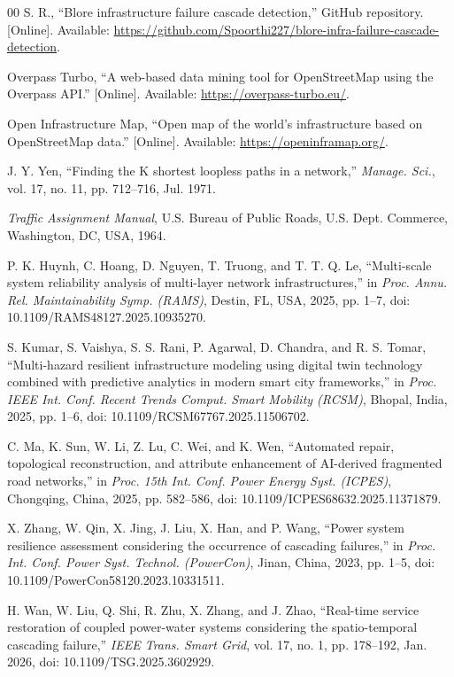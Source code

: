 \documentclass[oneside]{ieeeaccess}
\begin{document}
\begin{thebibliography}{00}
S. R., ``Blore infrastructure failure cascade detection,'' GitHub repository. [Online]. Available: \url{https://github.com/Spoorthi227/blore-infra-failure-cascade-detection}.

Overpass Turbo, ``A web-based data mining tool for OpenStreetMap using the Overpass API.'' [Online]. Available: \url{https://overpass-turbo.eu/}.

Open Infrastructure Map, ``Open map of the world's infrastructure based on OpenStreetMap data.'' [Online]. Available: \url{https://openinframap.org/}.

J. Y. Yen, ``Finding the K shortest loopless paths in a network,'' \emph{Manage. Sci.}, vol. 17, no. 11, pp. 712--716, Jul. 1971.

\emph{Traffic Assignment Manual}, U.S. Bureau of Public Roads, U.S. Dept. Commerce, Washington, DC, USA, 1964.

P. K. Huynh, C. Hoang, D. Nguyen, T. Truong, and T. T. Q. Le, ``Multi-scale system reliability analysis of multi-layer network infrastructures,'' in \emph{Proc. Annu. Rel. Maintainability Symp. (RAMS)}, Destin, FL, USA, 2025, pp. 1--7, doi: 10.1109/RAMS48127.2025.10935270.

S. Kumar, S. Vaishya, S. S. Rani, P. Agarwal, D. Chandra, and R. S. Tomar, ``Multi-hazard resilient infrastructure modeling using digital twin technology combined with predictive analytics in modern smart city frameworks,'' in \emph{Proc. IEEE Int. Conf. Recent Trends Comput. Smart Mobility (RCSM)}, Bhopal, India, 2025, pp. 1--6, doi: 10.1109/RCSM67767.2025.11506702.

C. Ma, K. Sun, W. Li, Z. Lu, C. Wei, and K. Wen, ``Automated repair, topological reconstruction, and attribute enhancement of AI-derived fragmented road networks,'' in \emph{Proc. 15th Int. Conf. Power Energy Syst. (ICPES)}, Chongqing, China, 2025, pp. 582--586, doi: 10.1109/ICPES68632.2025.11371879.

X. Zhang, W. Qin, X. Jing, J. Liu, X. Han, and P. Wang, ``Power system resilience assessment considering the occurrence of cascading failures,'' in \emph{Proc. Int. Conf. Power Syst. Technol. (PowerCon)}, Jinan, China, 2023, pp. 1--5, doi: 10.1109/PowerCon58120.2023.10331511.

H. Wan, W. Liu, Q. Shi, R. Zhu, X. Zhang, and J. Zhao, ``Real-time service restoration of coupled power-water systems considering the spatio-temporal cascading failure,'' \emph{IEEE Trans. Smart Grid}, vol. 17, no. 1, pp. 178--192, Jan. 2026, doi: 10.1109/TSG.2025.3602929.

\end{thebibliography}
\end{document}
